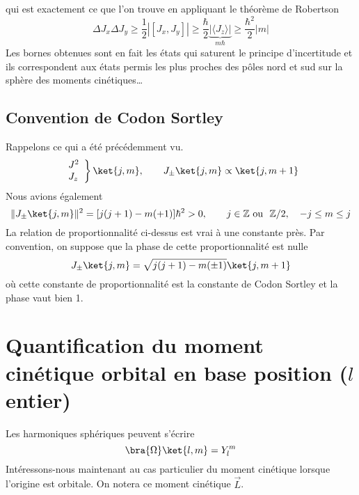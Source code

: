 	qui est exactement ce que l'on trouve en appliquant le théorème de Robertson	
	\begin{equation}
	\Delta J_x\Delta J_y \geq \frac{1}{2}|[J_x,J_y]| \geq \frac{\hbar}{2}\underbrace{|\langle J_z\rangle|}_{m
	\hbar} \geq \frac{\hbar^2}{2}|m|
	\end{equation}
	Les bornes obtenues sont en fait les états qui saturent le principe d'incertitude et ils
	correspondent aux états permis les plus proches des pôles nord et sud sur la sphère des
	moments cinétiques\dots
	
	\subsection{Convention de Codon Sortley}
	Rappelons ce qui a été précédemment vu. 
	\begin{equation}
	\left.\begin{array}{l}
	J^2\\
	J_z
	\end{array}\right\}\ket{j,m},\qquad J_\pm\ket{j,m} \propto \ket{j,m+1}
	\end{equation}
	Nous avions également
	\begin{equation}
	\|J_\pm\ket{j,m}\|^2 = [j(j+1)-m(+1)]\hbar^2 >0,\qquad j\in\mathbb{Z}\ \text{ou }\ \mathbb{Z}/2, 
	\quad -j\leq m \leq j
	\end{equation}
	La relation de proportionnalité ci-dessus est vrai à une constante près. Par convention, 
	on suppose que la phase de cette proportionnalité est nulle
	\begin{equation}
	J_\pm \ket{j,m} = \sqrt{j(j+1)-m(\pm 1)}\ket{j,m+1}
	\end{equation}
	où cette constante de proportionnalité est la constante de Codon Sortley et la phase vaut bien 
	1.
	


\section{Quantification du moment cinétique orbital en base position ($l$ entier)}
Les harmoniques sphériques peuvent s'écrire
\begin{equation}
\bra{\Omega}\ket{l,m} = Y_l^m
\end{equation}
Intéressons-nous maintenant au cas particulier du moment cinétique lorsque l'origine est orbitale. 
On notera ce moment cinétique $\vec{L}$.\\

